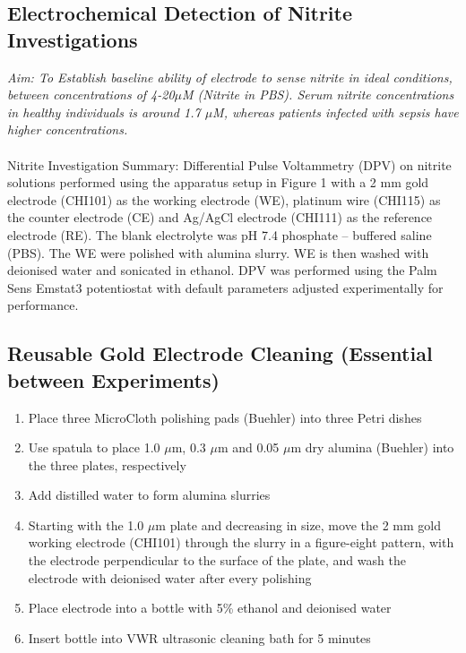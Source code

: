 \begin{appendices}
\subsection{Electrochemical Detection of Nitrite Investigations} 
\textit{Aim: To Establish baseline ability of electrode to sense nitrite in ideal conditions, between concentrations of 4-20$\mu$M (Nitrite in PBS). Serum nitrite concentrations in healthy individuals is around 1.7 $\mu$M, whereas patients infected with sepsis have higher concentrations.} \\\\
Nitrite Investigation Summary:
Differential Pulse Voltammetry (DPV) on nitrite solutions performed using the apparatus setup in Figure 1 with a 2 mm gold electrode (CHI101) as the working electrode (WE), platinum wire (CHI115) as the counter electrode (CE) and Ag/AgCl electrode (CHI111) as the reference electrode (RE). The blank electrolyte was pH 7.4 phosphate – buffered saline (PBS). The WE were polished with alumina slurry. WE is then washed with deionised water and sonicated in ethanol. DPV was performed using the Palm Sens Emstat3 potentiostat with default parameters adjusted experimentally for performance.
\subsection{Reusable Gold Electrode Cleaning (Essential between Experiments)}
\begin{enumerate}
    \item Place three MicroCloth polishing pads (Buehler) into three Petri dishes
    \item Use spatula to place 1.0 $\mu$m, 0.3 $\mu$m and 0.05 $\mu$m dry alumina (Buehler) into the three plates, respectively
    \item Add distilled water to form alumina slurries
    \item Starting with the 1.0 $\mu$m plate and decreasing in size, move the 2 mm gold working electrode (CHI101) through the slurry in a figure-eight pattern, with the electrode perpendicular to the surface of the plate, and wash the electrode with deionised water after every polishing
    \item Place electrode into a bottle with 5\% ethanol and deionised water
    \item Insert bottle into VWR ultrasonic cleaning bath for 5 minutes
\end{enumerate}


\end{appendices}
